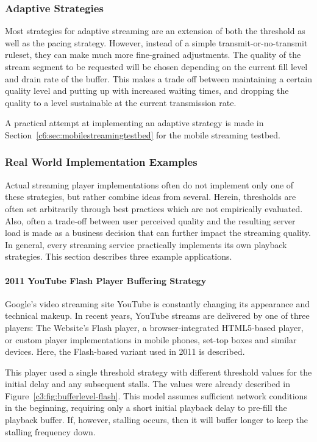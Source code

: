 \subsubsection{Adaptive Strategies}

Most strategies for adaptive streaming are an extension of both the threshold as well as the pacing strategy. However, instead of a simple transmit-or-no-transmit ruleset, they can make much more fine-grained adjustments. The quality of the stream segment to be requested will be chosen depending on the current fill level and drain rate of the buffer. This makes a trade off between maintaining a certain quality level and putting up with increased waiting times, and dropping the quality to a level sustainable at the current transmission rate.

A practical attempt at implementing an adaptive strategy is made in Section~\ref{c6:sec:mobilestreamingtestbed} for the mobile streaming testbed.


\subsubsection{Real World Implementation Examples}

Actual streaming player implementations often do not implement only one of these strategies, but rather combine ideas from several. Herein, thresholds are often set arbitrarily through best practices which are not empirically evaluated. Also, often a trade-off between user perceived quality and the resulting server load is made as a business decision that can further impact the streaming quality. In general, every streaming service practically implements its own playback strategies. This section describes three example applications.

\paragraph{2011 YouTube Flash Player Buffering Strategy}

Google's video streaming site YouTube is constantly changing its appearance and technical makeup. In recent years, YouTube streams are delivered by one of three players: The Website's Flash player, a browser-integrated \acrshort{HTML}5-based player, or custom player implementations in mobile phones, set-top boxes and similar devices. Here, the Flash-based variant used in 2011 is described.

This player used a single threshold strategy with different threshold values for the initial delay and any subsequent stalls. The values were already described in Figure~\ref{c3:fig:bufferlevel-flash}. This model assumes sufficient network conditions in the beginning, requiring only a short initial playback delay to pre-fill the playback buffer. If, however, stalling occurs, then it will buffer longer to keep the stalling frequency down.


